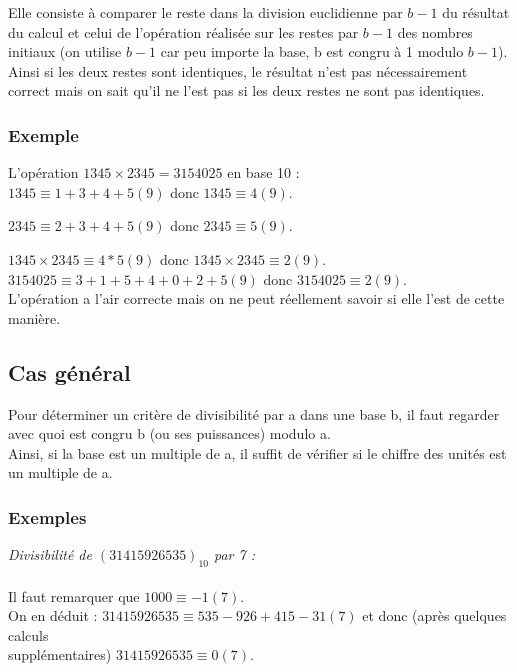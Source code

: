 \documentclass[a4paper,10pt]{book}
\begin{document}
Elle consiste à comparer le reste dans la division euclidienne par $b-1$ du résultat du calcul et celui de l'opération réalisée sur les restes par $b-1$ des nombres initiaux (on utilise $b-1$ car peu importe la base, b est congru à 1 modulo $b-1$).\\

Ainsi si les deux restes sont identiques, le résultat n'est pas nécessairement correct mais on sait qu'il ne l'est pas si les deux restes ne sont pas identiques.

\subsubsection{Exemple}
L'opération $1345\times 2345=3154025$ en base 10 :\\

$1345 \equiv 1+3+4+5 (9)$ donc $1345 \equiv 4(9)$.

$2345 \equiv 2+3+4+5 (9)$ donc $2345 \equiv 5(9)$.

$1345\times 2345 \equiv 4*5(9)$ donc $1345\times 2345 \equiv 2(9)$.\\

$3154025 \equiv 3+1+5+4+0+2+5(9)$ donc $3154025 \equiv 2(9)$.\\

L'opération a l'air correcte mais on ne peut réellement savoir si elle l'est de cette manière.

\subsection{Cas général}
Pour déterminer un critère de divisibilité par a dans une base b, il faut regarder avec quoi est congru b (ou ses puissances) modulo a.\\

Ainsi, si la base est un multiple de a, il suffit de vérifier si le chiffre des unités est un multiple de a.

\subsubsection{Exemples}
\emph{Divisibilité de $(31415926535)_{10}$ par 7 :}\\\\
Il faut remarquer que $1000\equiv -1(7)$.\\

On en déduit : $31415926535 \equiv 535-926+415-31(7)$ et donc (après quelques calculs\\
supplémentaires) $31415926535 \equiv 0(7)$.\\\\\\
\end{document}
